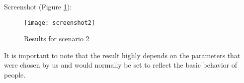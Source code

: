 Screenshot (Figure \ref{res:2}):

\begin{figure}[ht]
    \centering
        \texttt{[image: screenshot2]}
    \caption{Results for scenario 2}
    \label{res:2}
\end{figure}


It is important to note that the result highly depends on the parameters that were chosen by us and would normally be set to reflect the basic behavior of people.
